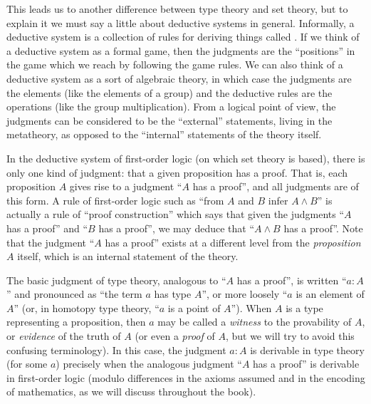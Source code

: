 This leads us to another difference between type theory and set theory, but to explain it we must say a little about deductive systems in general.
Informally, a deductive system is a collection of rules for deriving things called .
If we think of a deductive system as a formal game, then the judgments are the ``positions'' in the game which we reach by following the game rules.
We can also think of a deductive system as a sort of algebraic theory, in which case the judgments are the elements (like the elements of a group) and the deductive rules are the operations (like the group multiplication).
From a logical point of view, the judgments can be considered to be the ``external'' statements, living in the metatheory, as opposed to the ``internal'' statements of the theory itself.

In the deductive system of first-order logic (on which set theory is based), there is only one kind of judgment: that a given proposition has a proof.
That is, each proposition $A$ gives rise to a judgment ``$A$ has a proof'', and all judgments are of this form.
A rule of first-order logic such as ``from $A$ and $B$ infer $A\wedge B$'' is actually a rule of ``proof construction'' which says that given the judgments ``$A$ has a proof'' and ``$B$ has a proof'', we may deduce that ``$A\wedge B$ has a proof''.
Note that the judgment ``$A$ has a proof'' exists at a different level from the \emph{proposition} $A$ itself, which is an internal statement of the theory.

The basic judgment of type theory, analogous to ``$A$ has a proof'', is written ``$a:A$'' and pronounced as ``the term $a$ has type $A$'', or more loosely ``$a$ is an element of $A$'' (or, in homotopy type theory, ``$a$ is a point of $A$'').
When $A$ is a type representing a proposition, then $a$ may be called a \emph{witness} to the provability of $A$, or \emph{evidence} of the truth of $A$ (or even a \emph{proof} of $A$, but we will try to avoid this confusing terminology).
In this case, the judgment $a:A$ is derivable in type theory (for some $a$) precisely when the analogous judgment ``$A$ has a proof'' is derivable in first-order logic (modulo differences in the axioms assumed and in the encoding of mathematics, as we will discuss throughout the book).

